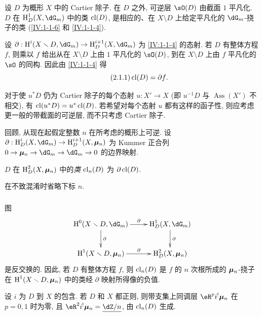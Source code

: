 设 $D$ 为概形 $X$ 中的 Cartier 除子. 在 $D$ 之外, 可逆层 $\sO(D)$ 由截面 $1$ 平凡化.
$D$ 在 $\h_D^1(X,\dG_m)$ 中的类 $\operatorname{cl}(D)$,
是相应的、在 $X\setminus D$ 上给定平凡化的 $\dG_m$-挠子的类
(\ref{IV:1-1-6} 和 \ref{IV:1-1-4}).

设 $\partial:\h^i(X\setminus D,\dG_m)\to \h_D^{i+1}(X,\dG_m)$ 为 \ref{IV:1-1-4} 的态射.
若 $D$ 有整体方程 $f$, 则乘以 $f$ 给出从在 $X\setminus D$ 上由 $1$ 平凡化的 $\sO(D)$,
到在 $X\setminus D$ 上由 $f$ 平凡化的 $\sO$ 的同构.
因此由 \ref{IV:1-1-4} 得
\begin{equation*}\tag{2.1.1}\label{IV:eq:2-1-1}
  \operatorname{cl}(D) = \partial f \text{.}
\end{equation*}

对于使 $u^* D$ 仍为 Cartier 除子的每个态射 $u:X'\to X$
(即 $u^{-1} D$ 与 $\operatorname{Ass}(X')$ 不相交), 有
$\operatorname{cl}(u^* D) = u^*\operatorname{cl}(D)$.
若希望对每个态射 $u$ 都有这样的函子性, 则应考虑更一般的带截面的可逆层, 而不只考虑 Cartier 除子.

回顾, 从现在起假定整数 $n$ 在所考虑的概形上可逆.
设 $\partial:\h_D^i(X,\dG_m) \to \h_D^{i+1}(X,\dmu_n)$
为 Kummer 正合列 $0 \to \dmu_n \to \dG_m \to \dG_m \to 0$ 的边界映射.

\begin{definition}\label{IV:2-1-2}
$D$ 在 $\operatorname{H}_D^2(X,{\bm\mu}_n)$ 中的\emph{类 $\operatorname{cl}_n(D)$} 为 $\partial \operatorname{cl}(D)$.
\end{definition}

在不致混淆时省略下标 $n$.

\subsubsection{}\label{IV:2-1-3}

图
\[\xymatrix{
  \h^0(X\setminus D,\dG_m) \ar[r]^-\partial \ar[d]^-\partial
    & \h_D^1(X,\dG_m) \ar[d]^-\partial \\
  \h^1(X\setminus D,\dmu_n) \ar[r]^-\partial
    & \h_D^2(X,\dmu_n)
}\]
是反交换的. 因此, 若 $D$ 有整体方程 $f$, 则 $\operatorname{cl}_n(D)$
是 $f$ 的 $n$ 次根所成的 ${\bm\mu}_n$-挠子在 $\operatorname{H}^1(X\smallsetminus D,{\bm\mu}_n)$ 中的类经 $\partial$ 映射所得像的负值.

\begin{proposition}\label{IV:2-1-4}
设 $i$ 为 $D$ 到 $X$ 的包含. 若 $D$ 和 $X$ 都正则,
则带支集上同调层 $\eR^p i^! \dmu_n$ 在 $p=0,1$ 时为零,
且 $\eR^2 i^!\dmu_n = \underline{\dZ/n}$, 由 $\operatorname{cl}_n(D)$ 生成.
\end{proposition}

